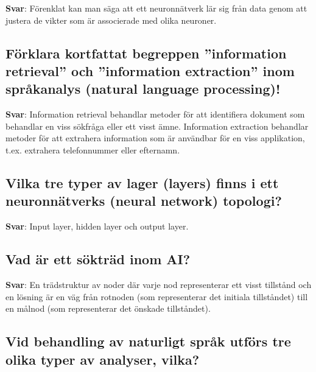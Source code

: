\documentclass[a4paper,11pt,oneside]{article}
\begin{document}
\begin{sloppypar}
\label{q:317:sa:sv:True}

\textbf{Svar}: F\"orenklat kan man s\"aga att ett neuronn\"atverk l\"ar sig fr\r{a}n data genom att justera de vikter som \"ar associerade med olika neuroner.



\subsection{F\"orklara kortfattat begreppen {\textquotedblright}information retrieval{\textquotedblright} och {\textquotedblright}information extraction{\textquotedblright} inom spr\r{a}kanalys (natural language processing)!}

\label{q:318:sa:sv:True}

\textbf{Svar}: Information retrieval behandlar metoder f\"or att identifiera dokument som behandlar en viss s\"okfr\r{a}ga eller ett visst \"amne. Information extraction behandlar metoder f\"or att extrahera information som \"ar anv\"andbar f\"or en viss applikation, t.ex. extrahera telefonnummer eller efternamn.



\subsection{Vilka tre typer av lager (layers) finns i ett neuronn\"atverks (neural network) topologi?}

\label{q:319:sa:sv:True}

\textbf{Svar}: Input layer, hidden layer och output layer.



\subsection{Vad \"ar ett s\"oktr\"ad inom AI?}

\label{q:320:sa:sv:True}

\textbf{Svar}: En tr\"adstruktur av noder d\"ar varje nod representerar ett visst tillst\r{a}nd och en l\"osning \"ar en v\"ag fr\r{a}n rotnoden (som representerar det initiala tillst\r{a}ndet) till en m\r{a}lnod (som representerar det \"onskade tillst\r{a}ndet).



\subsection{Vid behandling av naturligt spr\r{a}k utf\"ors tre olika typer av analyser, vilka?}


\end{sloppypar}
\end{document}
